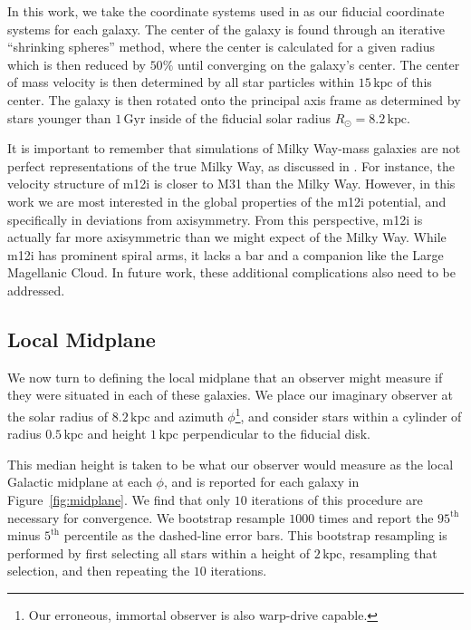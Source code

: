 \documentclass[twocolumn]{aastex62}
\newcommand{\kpc}{\text{kpc}}
\newcommand{\Gyr}{\text{Gyr}}
\begin{document}
In this work, we take the coordinate systems used in
\citet{2018arXiv180610564S} as our fiducial coordinate systems for each
galaxy. The center of the galaxy is found through an iterative ``shrinking
spheres'' method, where the center is calculated for a given radius which is
then reduced by $50\%$ until converging on the galaxy's center. The center of
mass velocity is then determined by all star particles within $15\,\kpc$ of
this center. The galaxy is then rotated onto the principal axis frame as
determined by stars younger than $1\,\Gyr$ inside of the fiducial solar radius
$R_{\odot} = 8.2\,\kpc$.

It is important to remember that simulations of Milky Way-mass galaxies are
not perfect representations of the true Milky Way, as discussed in
\citet{2018arXiv180610564S}. For instance, the velocity structure of m12i is
closer to M31 than the Milky Way. However, in this work we are most interested
in the global properties of the m12i potential, and specifically in deviations
from axisymmetry. From this perspective, m12i is actually far more
axisymmetric than we might expect of the Milky Way. While m12i has prominent
spiral arms, it lacks a bar and a companion like the Large Magellanic Cloud.
In future work, these additional complications also need to be addressed.

\subsection{Local Midplane} \label{ssec:local_midplane}
We now turn to defining the local midplane that an observer might measure if
they were situated in each of these galaxies. We place our imaginary observer
at the solar radius of $8.2\,\kpc$ and azimuth $\phi$\footnote{Our erroneous,
immortal observer is also warp-drive capable.}, and consider stars within a
cylinder of radius $0.5\,\kpc$ and height $1\,\kpc$ perpendicular to the
fiducial disk.

This median height is taken to be what our observer would measure as the local
Galactic midplane at each $\phi$, and is reported for each galaxy in
Figure~\ref{fig:midplane}. We find that only $10$ iterations of this procedure
are necessary for convergence. We bootstrap resample $1000$ times and report
the $95^{\text{th}}$ minus $5^{\text{th}}$ percentile as the dashed-line error
bars. This bootstrap resampling is performed by first selecting all stars
within a height of $2\,\kpc$, resampling that selection, and then repeating
the $10$ iterations.
\end{document}
